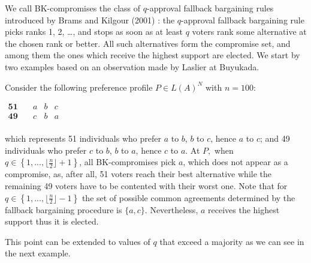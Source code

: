 \documentclass[version=3.21, pagesize, notitlepage, twoside=off, bibliography=totoc, DIV=calc, fontsize=12pt, a4paper]{scrartcl}
\begin{document}
We call BK-compromises the class of $q$-approval fallback bargaining rules introduced by Brams and Kilgour (2001) \cite{Brams2001}: the $q$-approval fallback bargaining rule picks ranks 1, 2, …, and stops as soon as at least $q$ voters rank some alternative at the chosen rank or better. All such alternatives form the compromise set, and among them the ones which receive the highest support are elected.
We start by two examples based on an observation made by Laslier at Buyukada. 
\begin{example}
	Consider the following preference profile $P\in L(A)^{N}$ with $n=100$:
	\begin{center}
		$
		\begin{array}{cccc}
		\mathbf{51} \quad &a&b&c\\
		\mathbf{49} \quad &c&b&a\\
		\end{array}
		$
	\end{center}
	which represents 51 individuals who prefer $a$ to $b$, $b$ to $c$, hence $a$ to $c$; and 49 individuals who prefer $c$ to $b$, $b$ to $a$, hence $c$ to $a $. At $P,$ when $q\in \left\{ 1,..., \lfloor \frac{n}{2}\rfloor +1\right\} $, all BK-compromises pick $a$, which does not appear as a compromise, as, after all, 51 voters reach their best alternative while the remaining 49 voters have to be contented with their worst one. Note that for $q\in \left\{ 1,..., \lfloor \frac{n}{2}\rfloor -1 \right\} $ the set of possible common agreements determined by the fallback bargaining procedure is $\{a,c\}$. Nevertheless, $a$ receives the highest support thus it is elected.
\end{example}

This point can be extended to values of $q$ that exceed a majority as we can see in the next example.
\end{document}
